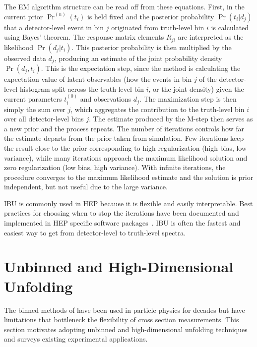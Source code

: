 The EM algorithm structure can be read off from these equations.
First, in  the current prior $\Pr^{(n)}(t_i)$ is held fixed and the posterior probability $\Pr(t_i | d_j)$ that a detector-level event in bin $j$ originated from truth-level bin $i$ is calculated using Bayes' theorem.
The response matrix elements $R_{ji}$ are interpreted as the likelihood $\Pr(d_j|t_i)$.
This posterior probability is then multiplied by the observed data $d_j$, producing an estimate of the joint probability density $\Pr(d_j, t_i)$.
This is the expectation step, since the method is calculating the expectation value of latent observables (how the events in bin $j$ of the detector-level histogram split across the truth-level bin $i$, or the joint density) given the current parameters $t_i^{(0)}$ and observations $d_j$.
The maximization step is then simply the sum over $j$, which aggregates the contribution to the truth-level bin $i$ over all detector-level bins $j$.
The estimate produced by the M-step then serves as a new prior and the process repeats.
The number of iterations controls how far the estimate departs from the prior taken from simulation.
Few iterations keep the result close to the prior corresponding to high regularization (high bias, low variance), while many iterations approach the maximum likelihood solution and zero regularization (low bias, high variance).
With infinite iterations, the procedure converges to the maximum likelihood estimate and the solution is prior independent, but not useful due to the large variance.

IBU is commonly used in HEP because it is flexible and easily interpretable.
Best practices for choosing when to stop the iterations have been documented and implemented in HEP specific software packages~\cite{Brenner:2019lmf}.
IBU is often the fastest and easiest way to get from detector-level to truth-level spectra.

\section{Unbinned and High-Dimensional Unfolding}
\label{sec:ai-unfolding-motivation}

The binned methods of  have been used in particle physics for decades but have limitations that bottleneck the flexibility of cross section measurements.
This section motivates adopting unbinned and high-dimensional unfolding techniques and surveys existing experimental applications.

